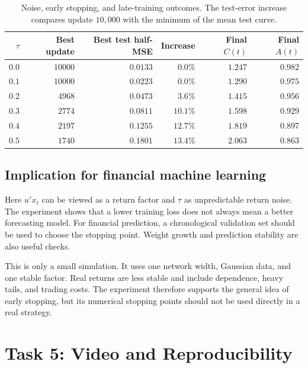 \documentclass[11pt]{article}
\begin{document}
\clearpage
\begin{table}[htbp]
    \centering
    \small
    \caption{Noise, early stopping, and late-training outcomes. The test-error
    increase compares update $10{,}000$ with the minimum of the mean test
    curve.}
    \label{tab:task4-results}
    \begin{tabular}{rrrrrr}
        \toprule
        $\tau$ & Best update & Best test half-MSE & Increase & Final $C(t)$
        & Final $A(t)$ \\
        \midrule
        $0.0$ & $10000$ & $0.0133$ & $0.0\%$  & $1.247$ & $0.982$ \\
        $0.1$ & $10000$ & $0.0223$ & $0.0\%$  & $1.290$ & $0.975$ \\
        $0.2$ & $4968$  & $0.0473$ & $3.6\%$  & $1.415$ & $0.956$ \\
        $0.3$ & $2774$  & $0.0811$ & $10.1\%$ & $1.598$ & $0.929$ \\
        $0.4$ & $2197$  & $0.1255$ & $12.7\%$ & $1.819$ & $0.897$ \\
        $0.5$ & $1740$  & $0.1801$ & $13.4\%$ & $2.063$ & $0.863$ \\
        \bottomrule
    \end{tabular}
\end{table}

\subsection{Implication for financial machine learning}

Here $u'x_t$ can be viewed as a return factor and $\tau$ as unpredictable
return noise. The experiment shows that a lower training loss does not always
mean a better forecasting model. For financial prediction, a chronological
validation set should be used to choose the stopping point. Weight growth and
prediction stability are also useful checks.

This is only a small simulation. It uses one network width, Gaussian data,
and one stable factor. Real returns are less stable and include dependence,
heavy tails, and trading costs. The experiment therefore supports the general
idea of early stopping, but its numerical stopping points should not be used
directly in a real strategy.

\section{Task 5: Video and Reproducibility}
\end{document}
